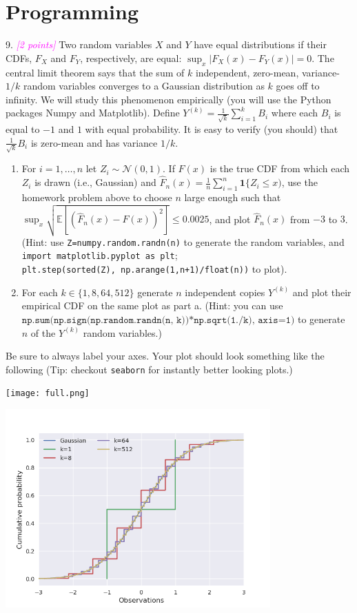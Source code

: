 \documentclass{article}
\newcommand{\1}{\mathbf{1}}
\newcommand{\E}{\mathbb{E}}
\newcommand{\grade}[1]{\small\textcolor{magenta}{\emph{[#1 points]}} \normalsize}
\begin{document}
{\color{blue}

\section{Programming}

9. \grade{2} Two random variables $X$ and $Y$ have equal distributions if their CDFs, $F_X$ and $F_Y$, respectively, are equal: $\sup_{x} |F_X(x) - F_Y(x)| = 0$. 
The central limit theorem says that the sum of $k$ independent, zero-mean, variance-$1/k$ random variables converges to a Gaussian distribution as $k$ goes off to infinity.  
We will study this phenomenon empirically (you will use the Python packages Numpy and Matplotlib). 
Define $Y^{(k)} = \frac{1}{\sqrt{k}} \sum_{i=1}^k B_i$ where each $B_i$ is equal to $-1$ and $1$ with equal probability.
It is easy to verify (you should) that $\frac{1}{\sqrt{k}} B_i$ is zero-mean and has variance $1/k$.
\begin{enumerate}
	\item For $i=1,\dots,n$ let $Z_i \sim \mathcal{N}(0,1)$. If $F(x)$ is the true CDF from which each $Z_i$ is drawn (i.e., Gaussian) and $\widehat{F}_n(x) = \frac{1}{n} \sum_{i=1}^n \1\{ Z_i \leq x)$, use the homework problem above to choose $n$ large enough such that $\sup_x \sqrt{\E[ (\widehat{F}_n(x)-F(x))^2 ]} \leq 0.0025$, and plot $\widehat{F}_n(x)$ from $-3$ to $3$. (Hint: use \texttt{Z=numpy.random.randn(n)} to generate the random variables, and \texttt{import matplotlib.pyplot as plt};\\ \texttt{plt.step(sorted(Z), np.arange(1,n+1)/float(n))} to plot).
	\item For each $k \in \{1, 8, 64, 512\}$ generate $n$ independent copies $Y^{(k)}$ and plot their empirical CDF on the same plot as part a. (Hint: you can use $\texttt{np.sum(np.sign(np.random.randn(n, k))*np.sqrt(1./k), axis=1)}$ to generate $n$ of the $Y^{(k)}$ random variables.)
\end{enumerate}
Be sure to always label your axes. 
Your plot should look something like the following (Tip: checkout \texttt{seaborn} for instantly better looking plots.)
\begin{center}
\texttt{[image: full.png]}
\end{center} 
}

\includegraphics[width=4in]{problem9.png}


\end{document}
